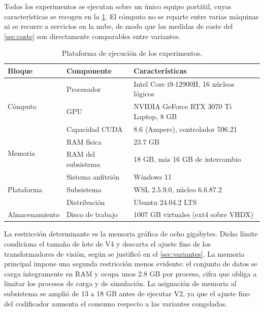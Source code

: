 Todos los experimentos se ejecutan sobre un \'unico equipo port\'atil, cuyas
caracter\'isticas se recogen en la \cref{tab:entorno}. El c\'omputo no se reparte entre
varias m\'aquinas ni se recurre a servicios en la nube, de modo que las medidas de coste
del \cref{sec:coste} son directamente comparables entre variantes.

\begin{table}[htbp]
  \centering
  \caption{Plataforma de ejecuci\'on de los experimentos.}
  \label{tab:entorno}
  \small
  \begin{tabular}{lll}
    \toprule
    Bloque & Componente & Caracter\'isticas \\
    \midrule
    \multirow{3}{*}{C\'omputo}
      & Procesador       & Intel Core i9-12900H, \num{16} n\'ucleos l\'ogicos \\
      & GPU              & NVIDIA GeForce RTX 3070 Ti Laptop, \num{8} GB \\
      & Capacidad CUDA   & 8.6 (Ampere), controlador 596.21 \\
    \midrule
    \multirow{2}{*}{Memoria}
      & RAM f\'isica     & \num{23.7} GB \\
      & RAM del subsistema & \num{18} GB, m\'as \num{16} GB de intercambio \\
    \midrule
    \multirow{3}{*}{Plataforma}
      & Sistema anfitri\'on & Windows 11 \\
      & Subsistema          & WSL 2.5.9.0, n\'ucleo 6.6.87.2 \\
      & Distribuci\'on      & Ubuntu 24.04.2 LTS \\
    \midrule
    Almacenamiento & Disco de trabajo & \num{1007} GB virtuales (ext4 sobre VHDX) \\
    \bottomrule
  \end{tabular}
\end{table}

La restricci\'on determinante es la memoria gr\'afica de ocho gigabytes. Dicho l\'imite
condiciona el tama\~no de lote de V4 y descarta el ajuste fino de los transformadores de
visi\'on, seg\'un se justific\'o en el \cref{sec:variantes}. La memoria principal impone una
segunda restricci\'on menos evidente: el conjunto de datos se carga \'integramente en RAM y
ocupa unos \num{2.8} GB por proceso, cifra que obliga a limitar los procesos de carga y de
simulaci\'on. La asignaci\'on de memoria al subsistema se ampli\'o de \num{13} a \num{18}
GB antes de ejecutar V2, ya que el ajuste fino del codificador aumenta el consumo respecto
a las variantes congeladas.

